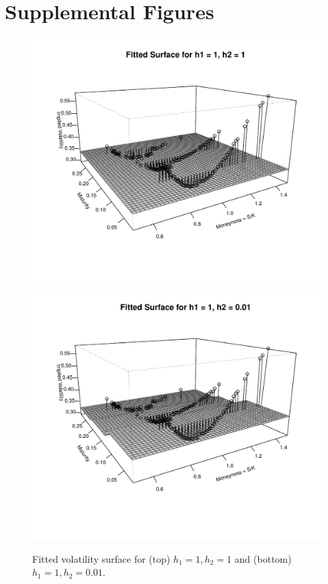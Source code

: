 \documentclass[11pt]{article}
\begin{document}
\section{Supplemental Figures}
\begin{figure}[H]
	\centering
 	\includegraphics[scale=0.675]{../plots/q2/fitted_2d_1_1.pdf}
 	\includegraphics[scale=0.675]{../plots/q2/fitted_2d_1_001.pdf}
\caption{Fitted volatility surface for (top) $h_1 = 1, h_2 = 1$ and (bottom) $h_1 = 1, h_2 = 0.01$.}
\label{fig:fitted_2d_1_1}
\end{figure}
\end{document}

